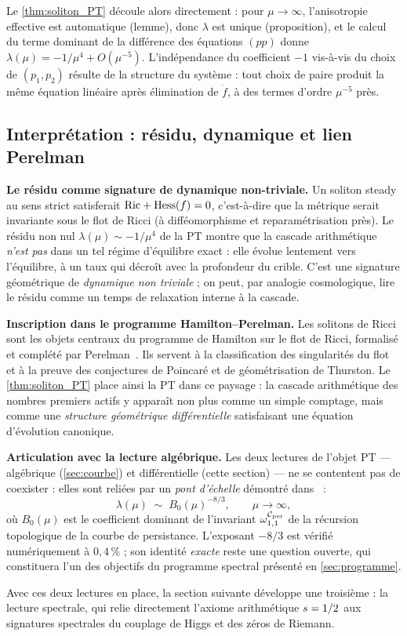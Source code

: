 Le \ref{thm:soliton_PT} découle alors directement : pour $\mu \to \infty$, l'anisotropie effective est automatique (lemme), donc $\lambda$ est unique (proposition), et le calcul du terme dominant de la différence des équations $(pp)$ donne $\lambda(\mu) = -1/\mu^{4} + O(\mu^{-5})$. L'indépendance du coefficient $-1$ vis-à-vis du choix de $(p_1, p_2)$ résulte de la structure du système : tout choix de paire produit la même équation linéaire après élimination de $\dot f$, à des termes d'ordre $\mu^{-5}$ près.

\subsection{Interprétation : résidu, dynamique et lien Perelman}
\label{sec:soliton:perelman}

\textbf{Le résidu comme signature de dynamique non-triviale.}
Un soliton steady au sens strict satisferait $\mathrm{Ric} + \mathrm{Hess}(f) = 0$, c'est-à-dire que la métrique serait invariante sous le flot de Ricci (à difféomorphisme et reparamétrisation près). Le résidu non nul $\lambda(\mu) \sim -1/\mu^{4}$ de la PT montre que la cascade arithmétique \emph{n'est pas} dans un tel régime d'équilibre exact : elle évolue lentement vers l'équilibre, à un taux qui décroît avec la profondeur du crible. C'est une signature géométrique de \emph{dynamique non triviale} ; on peut, par analogie cosmologique, lire le résidu comme un \og temps de relaxation \fg{} interne à la cascade.

\textbf{Inscription dans le programme Hamilton--Perelman.}
Les solitons de Ricci sont les objets centraux du programme de Hamilton sur le flot de Ricci, formalisé et complété par Perelman~\cite{Perelman2002}. Ils servent à la classification des singularités du flot et à la preuve des conjectures de Poincaré et de géométrisation de Thurston. Le \ref{thm:soliton_PT} place ainsi la PT dans ce paysage : la cascade arithmétique des nombres premiers actifs y apparaît non plus comme un simple comptage, mais comme une \emph{structure géométrique différentielle} satisfaisant une équation d'évolution canonique.

\textbf{Articulation avec la lecture algébrique.}
Les deux lectures de l'objet PT --- algébrique (\ref{sec:courbe}) et différentielle (cette section) --- ne se contentent pas de coexister : elles sont reliées par un \emph{pont d'échelle} démontré dans~\cite[\S 6]{PT_GeoFlow_RicciSoliton} :
\[
\lambda(\mu) \;\sim\; B_0(\mu)^{-8/3}, \qquad \mu \to \infty,
\]
où $B_0(\mu)$ est le coefficient dominant de l'invariant $\omega_{1,1}^{\mathcal{C}_{\rm per}}$ de la récursion topologique de la courbe de persistance. L'exposant $-8/3$ est vérifié numériquement à $0{,}4\,\%$ ; son identité \emph{exacte} reste une question ouverte, qui constituera l'un des objectifs du programme spectral présenté en \ref{sec:programme}.

Avec ces deux lectures en place, la section suivante développe une troisième : la lecture spectrale, qui relie directement l'axiome arithmétique $s = 1/2$ aux signatures spectrales du couplage de Higgs et des zéros de Riemann.
